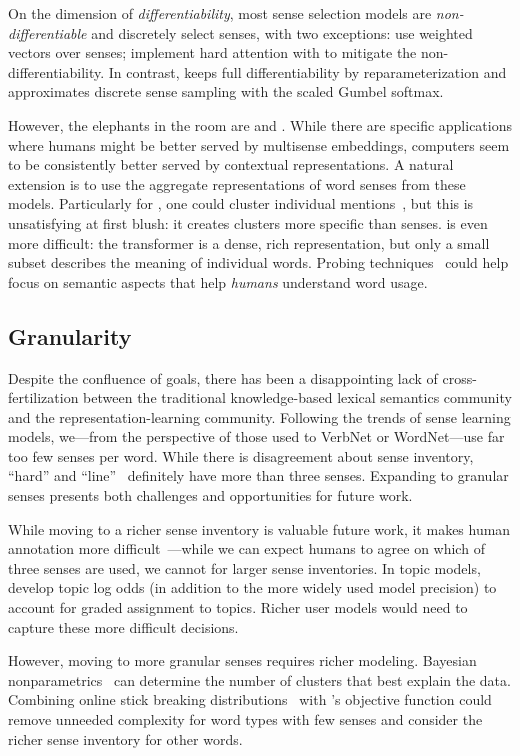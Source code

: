 On the dimension of \emph{differentiability}, most sense selection
models are \emph{non-differentiable} and discretely select senses,
with two exceptions:  use weighted
vectors over senses;
 implement hard attention with  to mitigate the non-differentiability.
In contrast, \gasi{} keeps full differentiability by
reparameterization and approximates discrete sense sampling with the
scaled Gumbel softmax.

However, the elephants in the room are  and \elmo{}.
While there are specific applications where humans might be better
served by multisense embeddings, computers seem to be consistently
better served by contextual representations.
A natural extension is to use the aggregate
representations of word senses from these models.
Particularly for
\elmo{}, one could cluster individual mentions~\cite{chang-19}, but
this is unsatisfying at first blush: it creates clusters 
more specific than senses.
 is even more
difficult: the transformer is a dense, rich representation, but
only a small subset describes the meaning of individual words.
Probing techniques~\cite{perone2018evaluation} could help focus on
semantic aspects that help \emph{humans} understand word usage.

 
\subsection{Granularity}

Despite the confluence of goals, there has been a disappointing lack
of cross-fertilization between the traditional knowledge-based lexical
semantics community and the representation-learning community.
Following the trends of sense learning models, we---from the
perspective of those used to VerbNet or WordNet---use far too few
senses per word.
While there is disagreement about sense inventory, ``hard'' and
``line''~\cite{leacock-98} definitely have more than three senses.
Expanding to granular senses presents both challenges and
opportunities for future work.

While moving to a richer sense inventory is valuable future work, it
makes human annotation more difficult~\cite{erk-13}---while we can
expect humans to agree on which of three senses are used, we cannot for
larger sense inventories.
In topic models, \citet{chang-09b} develop topic log odds (in addition
to the more widely used model precision) to account for graded
assignment to topics.
Richer user models would need to capture these more difficult
decisions.

However, moving to more granular senses requires richer modeling.
Bayesian nonparametrics~\citep{orbanz-10} can determine the
number of clusters that best explain the data.
Combining online stick breaking distributions~\cite{wang-11} with
\gasi{}'s objective function could remove unneeded complexity for
word types with few senses and consider the richer sense inventory for
other words.